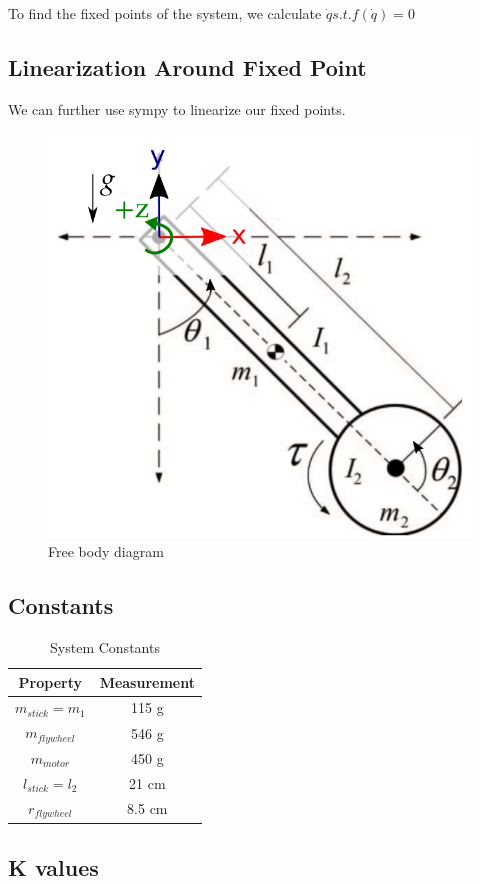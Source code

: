 \documentclass[conference]{IEEEtran}
\begin{document}
To find the fixed points of the system, we calculate $\dot q s.t. f(\dot q) = 0$

\subsection{Linearization Around Fixed Point}

We can further use sympy to linearize our fixed points.



\begin{figure}[!t]
    \centering
    \includegraphics[width=0.5\linewidth]{images/freebody.png}
    \caption{Free body diagram}
    \label{}
\end{figure}

\subsection{Constants}

\begin{table}[!t]
    \renewcommand{\arraystretch}{1.5}
    \caption{System Constants}
    \label{table_example}
    \centering
    \begin{tabular}{|c|c|}
        \hline
        Property & Measurement \\
        \hline
        $m_{stick} = m_1$ & 115 g \\
        $m_{flywheel}$ & 546 g\\
        $m_{motor}$ & 450 g \\ %
        $l_{stick} = l_2$ & 21 cm \\
        $r_{flywheel}$ & 8.5 cm \\ %
        \hline
    \end{tabular}
\end{table}


\subsection{K values}
\end{document}
